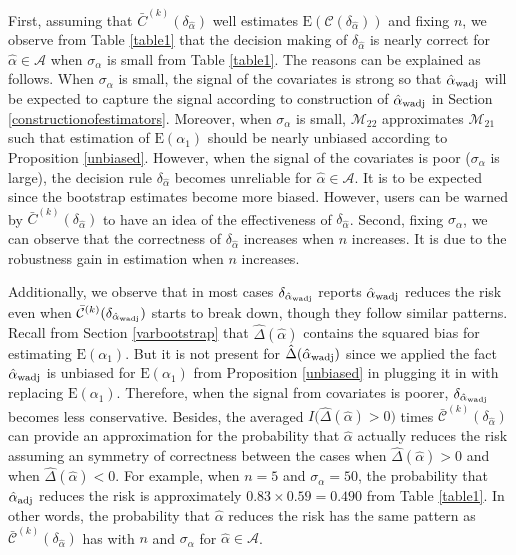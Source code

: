 \documentclass[11pt,3p,review,authoryear]{elsarticle}
\def\mc#1{\mathcal{#1}} %
\def\E#1{\mathrm{E}(#1)} %
\theoremstyle{definition}
\begin{document}
First, assuming that $\bar{C}^{(k)}(\delta_{\hat{\alpha}})$ well estimates $\E{\mc{C}(\delta_{\hat{\alpha}}})$ and fixing $n$, we  observe from Table \ref{table1} that the decision making of $\delta_{\hat{\alpha}}$ is nearly correct  for $\hat{\alpha}\in \mc{A}$ when $\sigma_{\alpha}$ is small  from Table \ref{table1}. The reasons can be explained as follows. When $\sigma_{\alpha}$ is small, the signal of the covariates is strong so that $\hat{\alpha}_{\rm wadj}$ will be expected to capture the signal according to construction of $\hat{\alpha}_{\rm wadj}$ in Section \ref{constructionofestimators}. Moreover, when $\sigma_{\alpha}$ is small, $\mc{M}_{22}$ approximates $\mc{M}_{21}$ such that estimation of $\E{\alpha_1}$ should be nearly unbiased according to Proposition \ref{unbiased}. However, when the signal of the covariates is poor ($\sigma_{\alpha}$ is large), the decision rule $\delta_{\hat{\alpha}}$  becomes unreliable for $\hat{\alpha}\in \mc{A}$. It is to be expected since the bootstrap estimates become more biased. However, users can be warned by $\bar{C}^{(k)}(\delta_{\hat{\alpha}})$ to have an idea of the effectiveness of $\delta_{\hat{\alpha}}$. Second, fixing $\sigma_{\alpha}$, we can observe that the correctness of $\delta_{\hat{\alpha}}$ increases when $n$ increases. It is due to the robustness gain in estimation when $n$ increases.  


Additionally, we  observe that in most cases $\delta_{\hat{\alpha}_{\rm wadj}}$ reports $\hat{\alpha}_{\rm wadj}$ reduces the risk even when $\bar{\mc{C}}^{(k)}(\delta_{\hat{\alpha}_{\rm wadj}})$ starts to break down, though they  follow similar patterns.   Recall from Section \ref{varbootstrap} that $\hat{\Delta}(\hat{\alpha})$ contains the squared bias for estimating $\E{\alpha_1}$. But it is not present for $\hat{\Delta}(\hat{\alpha}_{\rm wadj})$ since we applied the fact  $\hat{\alpha}_{\rm wadj}$ is unbiased for $\E{\alpha_1}$ from Proposition \ref{unbiased} in plugging it in with replacing $\E{\alpha_1}$. Therefore, when the signal from covariates is poorer, $\delta_{\hat{\alpha}_{\rm wadj}}$ becomes less conservative. Besides, the averaged $I\big(\hat{\Delta}(\hat{\alpha})>0\big)$ times $\bar{\mc{C}}^{(k)}(\delta_{\hat{\alpha}})$ can provide an approximation for the probability that $\hat{\alpha}$ actually reduces the risk assuming an symmetry of correctness between the cases when $\hat{\Delta}(\hat{\alpha})>0$ and when $\hat{\Delta}(\hat{\alpha})<0$. For example, when $n = 5$ and $\sigma_{\alpha}=50$, the probability that $\hat{\alpha}_{\rm adj}$ reduces the risk is approximately $0.83 \times 0.59 = 0.490$ from Table \ref{table1}.  In other words,  the probability that $\hat{\alpha}$ reduces the risk has the same pattern as $\bar{\mc{C}}^{(k)}(\delta_{\hat{\alpha}})$ has with $n$ and $\sigma_{\alpha}$ for $\hat{\alpha}\in \mc{A}$.
\end{document}
